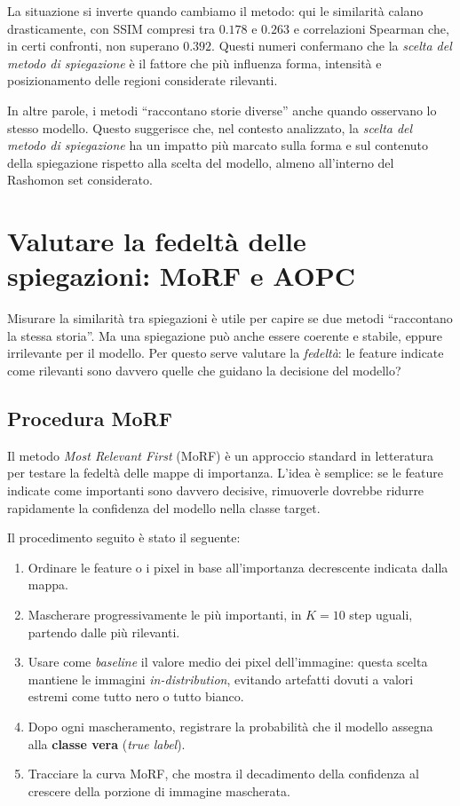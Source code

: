 \documentclass{article}
\begin{document}
La situazione si inverte quando cambiamo il metodo: qui le similarità calano
drasticamente, con SSIM compresi tra $0.178$ e $0.263$ e correlazioni Spearman
che, in certi confronti, non superano $0.392$. Questi numeri confermano che la
\emph{scelta del metodo di spiegazione} è il fattore che più influenza forma,
intensità e posizionamento delle regioni considerate rilevanti.

In altre parole, i metodi “raccontano storie diverse” anche quando osservano lo
stesso modello. Questo suggerisce che, nel contesto analizzato, la \emph{scelta
      del metodo di spiegazione} ha un impatto più marcato sulla forma e sul
contenuto della spiegazione rispetto alla scelta del modello, almeno
all’interno del Rashomon set considerato.

\section{Valutare la fedeltà delle spiegazioni: MoRF e AOPC}

Misurare la similarità tra spiegazioni è utile per capire se due metodi
``raccontano la stessa storia''. Ma una spiegazione può anche essere coerente e
stabile, eppure irrilevante per il modello. Per questo serve valutare la
\emph{fedeltà}: le feature indicate come rilevanti sono davvero quelle che
guidano la decisione del modello?

\subsection{Procedura MoRF}
Il metodo \emph{Most Relevant First} (MoRF) è un approccio standard in
letteratura per testare la fedeltà delle mappe di importanza. L’idea è
semplice: se le feature indicate come importanti sono davvero decisive,
rimuoverle dovrebbe ridurre rapidamente la confidenza del modello nella classe
target.

Il procedimento seguito è stato il seguente:
\begin{enumerate}
      \item Ordinare le feature o i pixel in base all’importanza decrescente indicata dalla
            mappa.
      \item Mascherare progressivamente le più importanti, in $K=10$ step uguali, partendo
            dalle più rilevanti.
      \item Usare come \emph{baseline} il valore medio dei pixel dell’immagine: questa
            scelta mantiene le immagini \emph{in-distribution}, evitando artefatti dovuti a
            valori estremi come tutto nero o tutto bianco.
      \item Dopo ogni mascheramento, registrare la probabilità che il modello assegna alla
            \textbf{classe vera} (\textit{true label}).
      \item Tracciare la curva MoRF, che mostra il decadimento della confidenza al crescere
            della porzione di immagine mascherata.
\end{enumerate}
\end{document}
